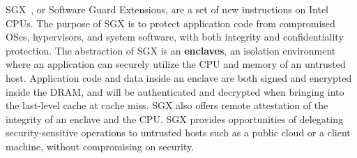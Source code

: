 SGX~\cite{intelsgx}, or Software Guard Extensions, are a set of new instructions on Intel CPUs.
The purpose of SGX
is to protect application code from compromised OSes, hypervisors, and system software,
with both integrity and confidentiality protection.
The abstraction of SGX is 
an {\bf enclaves}, 
an isolation environment where an application can securely
utilize the CPU and memory
of an untrusted host.
Application code and data inside an enclave are both signed and encrypted
inside the DRAM,
and will be authenticated and decrypted
when bringing into the last-level cache at cache miss.
SGX also offers remote attestation of the integrity of an enclave
and the CPU.
SGX provides opportunities of delegating security-sensitive operations
to untrusted hosts such as a public cloud
or a client machine,
without compromising on security.





